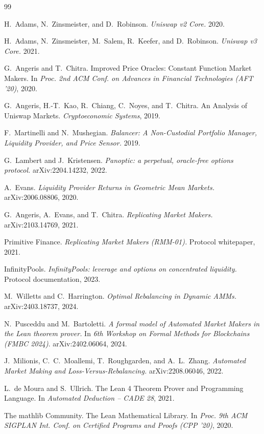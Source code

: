 \documentclass[runningheads]{llncs}
\begin{document}
\begin{thebibliography}{99}


H.~Adams, N.~Zinsmeister, and D.~Robinson. \emph{Uniswap v2 Core.} 2020.

H.~Adams, N.~Zinsmeister, M.~Salem, R.~Keefer, and D.~Robinson.
\emph{Uniswap v3 Core.} 2021.

G.~Angeris and T.~Chitra. Improved Price Oracles: Constant Function Market Makers.
In \emph{Proc. 2nd ACM Conf. on Advances in Financial Technologies (AFT '20)}, 2020.

G.~Angeris, H.-T.~Kao, R.~Chiang, C.~Noyes, and T.~Chitra.
An Analysis of Uniswap Markets. \emph{Cryptoeconomic Systems}, 2019.

F.~Martinelli and N.~Mushegian.
\emph{Balancer: A Non-Custodial Portfolio Manager, Liquidity Provider, and Price
Sensor.} 2019.

G.~Lambert and J.~Kristensen.
\emph{Panoptic: a perpetual, oracle-free options protocol.} arXiv:2204.14232, 2022.

A.~Evans. \emph{Liquidity Provider Returns in Geometric Mean Markets.}
arXiv:2006.08806, 2020.

G.~Angeris, A.~Evans, and T.~Chitra. \emph{Replicating Market Makers.}
arXiv:2103.14769, 2021.

Primitive Finance. \emph{Replicating Market Makers (RMM-01).}
Protocol whitepaper, 2021.

InfinityPools. \emph{InfinityPools: leverage and options on concentrated
liquidity.} Protocol documentation, 2023.

M.~Willetts and C.~Harrington. \emph{Optimal Rebalancing in Dynamic AMMs.}
arXiv:2403.18737, 2024.

N.~Pusceddu and M.~Bartoletti.
\emph{A formal model of Automated Market Makers in the Lean theorem prover.}
In \emph{6th Workshop on Formal Methods for Blockchains (FMBC 2024)}.
arXiv:2402.06064, 2024.

J.~Milionis, C.~C.~Moallemi, T.~Roughgarden, and A.~L.~Zhang.
\emph{Automated Market Making and Loss-Versus-Rebalancing.}
arXiv:2208.06046, 2022.

L.~de Moura and S.~Ullrich.
The Lean 4 Theorem Prover and Programming Language.
In \emph{Automated Deduction -- CADE 28}, 2021.

The mathlib Community. The Lean Mathematical Library.
In \emph{Proc. 9th ACM SIGPLAN Int. Conf. on Certified Programs and Proofs
(CPP '20)}, 2020.

\end{thebibliography}
\end{document}
